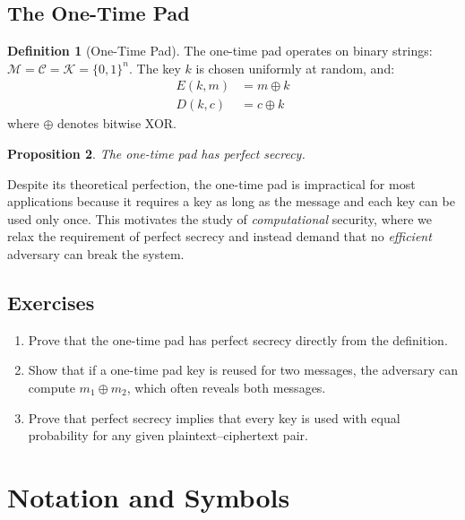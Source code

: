\documentclass[12pt,a4paper,openany]{book}
\theoremstyle{definition}
\newtheorem{definition}{Definition}[chapter]
\theoremstyle{plain}
\newtheorem{proposition}[definition]{Proposition}
\begin{document}
\section{The One-Time Pad}

\begin{definition}[One-Time Pad]
The one-time pad operates on binary strings: $\mathcal{M} = \mathcal{C} = \mathcal{K} = \{0, 1\}^n$. The key $k$ is chosen uniformly at random, and:
\begin{align}
  E(k, m) &= m \oplus k \\
  D(k, c) &= c \oplus k
\end{align}
where $\oplus$ denotes bitwise XOR.
\end{definition}

\begin{proposition}
The one-time pad has perfect secrecy.
\end{proposition}

Despite its theoretical perfection, the one-time pad is impractical for most applications because it requires a key as long as the message and each key can be used only once. This motivates the study of \textit{computational} security, where we relax the requirement of perfect secrecy and instead demand that no \textit{efficient} adversary can break the system.

\section{Exercises}

\begin{enumerate}[label=\textbf{\thechapter.\arabic*}]
  \item Prove that the one-time pad has perfect secrecy directly from the definition.
  \item Show that if a one-time pad key is reused for two messages, the adversary can compute $m_1 \oplus m_2$, which often reveals both messages.
  \item Prove that perfect secrecy implies that every key is used with equal probability for any given plaintext--ciphertext pair.
\end{enumerate}

\backmatter

\chapter{Notation and Symbols}
\end{document}
